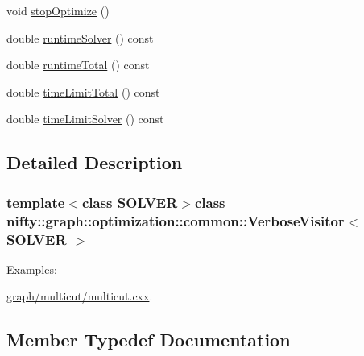 \begin{DoxyCompactItemize}
\item 
void \hyperlink{classnifty_1_1graph_1_1optimization_1_1common_1_1VerboseVisitor_a25a835d59de67abe5273874d7b282354}{stop\+Optimize} ()
\item 
double \hyperlink{classnifty_1_1graph_1_1optimization_1_1common_1_1VerboseVisitor_aa64c9a340dfe98024eabc1b2b821138a}{runtime\+Solver} () const 
\item 
double \hyperlink{classnifty_1_1graph_1_1optimization_1_1common_1_1VerboseVisitor_a1de8dbe55325711428a93352888b7df8}{runtime\+Total} () const 
\item 
double \hyperlink{classnifty_1_1graph_1_1optimization_1_1common_1_1VerboseVisitor_a7f781c5188962960470d5af7919b4b0e}{time\+Limit\+Total} () const 
\item 
double \hyperlink{classnifty_1_1graph_1_1optimization_1_1common_1_1VerboseVisitor_ad866c89e0f89adaec4dece682de2bd85}{time\+Limit\+Solver} () const 
\end{DoxyCompactItemize}


\subsection{Detailed Description}
\subsubsection*{template$<$class S\+O\+L\+V\+E\+R$>$class nifty\+::graph\+::optimization\+::common\+::\+Verbose\+Visitor$<$ S\+O\+L\+V\+E\+R $>$}

\begin{Desc}
\item[Examples\+: ]\par
\hyperlink{graph_2multicut_2multicut_8cxx-example}{graph/multicut/multicut.\+cxx}.\end{Desc}


\subsection{Member Typedef Documentation}
\hypertarget{classnifty_1_1graph_1_1optimization_1_1common_1_1VerboseVisitor_a5aa8c805242bf435548e2367674092d3}{}
